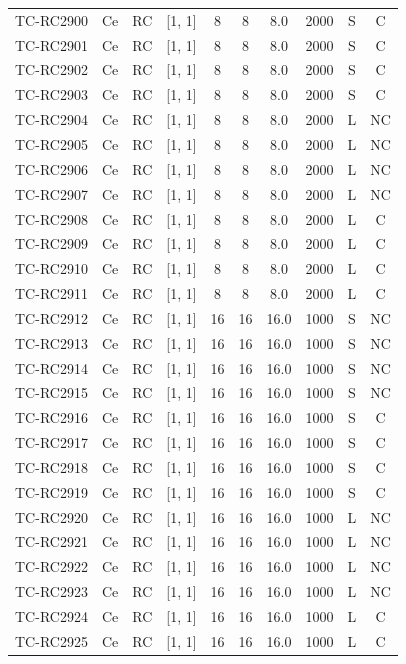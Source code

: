 \begin{longtable}{lccccccccc}
TC-RC2900 & Ce & RC & [1, 1] & 8 & 8 & 8.0 & 2000 & S & C \\
TC-RC2901 & Ce & RC & [1, 1] & 8 & 8 & 8.0 & 2000 & S & C \\
TC-RC2902 & Ce & RC & [1, 1] & 8 & 8 & 8.0 & 2000 & S & C \\
TC-RC2903 & Ce & RC & [1, 1] & 8 & 8 & 8.0 & 2000 & S & C \\
TC-RC2904 & Ce & RC & [1, 1] & 8 & 8 & 8.0 & 2000 & L & NC \\
TC-RC2905 & Ce & RC & [1, 1] & 8 & 8 & 8.0 & 2000 & L & NC \\
TC-RC2906 & Ce & RC & [1, 1] & 8 & 8 & 8.0 & 2000 & L & NC \\
TC-RC2907 & Ce & RC & [1, 1] & 8 & 8 & 8.0 & 2000 & L & NC \\
TC-RC2908 & Ce & RC & [1, 1] & 8 & 8 & 8.0 & 2000 & L & C \\
TC-RC2909 & Ce & RC & [1, 1] & 8 & 8 & 8.0 & 2000 & L & C \\
TC-RC2910 & Ce & RC & [1, 1] & 8 & 8 & 8.0 & 2000 & L & C \\
TC-RC2911 & Ce & RC & [1, 1] & 8 & 8 & 8.0 & 2000 & L & C \\
TC-RC2912 & Ce & RC & [1, 1] & 16 & 16 & 16.0 & 1000 & S & NC \\
TC-RC2913 & Ce & RC & [1, 1] & 16 & 16 & 16.0 & 1000 & S & NC \\
TC-RC2914 & Ce & RC & [1, 1] & 16 & 16 & 16.0 & 1000 & S & NC \\
TC-RC2915 & Ce & RC & [1, 1] & 16 & 16 & 16.0 & 1000 & S & NC \\
TC-RC2916 & Ce & RC & [1, 1] & 16 & 16 & 16.0 & 1000 & S & C \\
TC-RC2917 & Ce & RC & [1, 1] & 16 & 16 & 16.0 & 1000 & S & C \\
TC-RC2918 & Ce & RC & [1, 1] & 16 & 16 & 16.0 & 1000 & S & C \\
TC-RC2919 & Ce & RC & [1, 1] & 16 & 16 & 16.0 & 1000 & S & C \\
TC-RC2920 & Ce & RC & [1, 1] & 16 & 16 & 16.0 & 1000 & L & NC \\
TC-RC2921 & Ce & RC & [1, 1] & 16 & 16 & 16.0 & 1000 & L & NC \\
TC-RC2922 & Ce & RC & [1, 1] & 16 & 16 & 16.0 & 1000 & L & NC \\
TC-RC2923 & Ce & RC & [1, 1] & 16 & 16 & 16.0 & 1000 & L & NC \\
TC-RC2924 & Ce & RC & [1, 1] & 16 & 16 & 16.0 & 1000 & L & C \\
TC-RC2925 & Ce & RC & [1, 1] & 16 & 16 & 16.0 & 1000 & L & C \\

\end{longtable}
